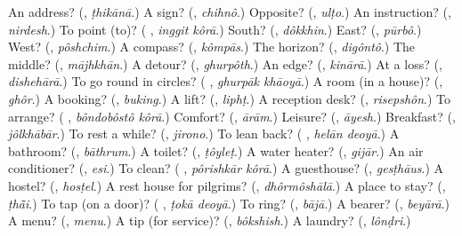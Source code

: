 \begin{tcolorbox}[breakable,colback=teal!4,colframe=teal!35!black,title={Before you move on}]
An address? (\textbf{}, \emph{ṭhikānā}.) A sign? (\textbf{}, \emph{chihnô}.) Opposite? (\textbf{}, \emph{ulṭo}.) An instruction? (\textbf{}, \emph{nirdesh}.) To point (to)? (\textbf{ }, \emph{inggit kôrā}.) South? (\textbf{}, \emph{dôkkhin}.) East? (\textbf{}, \emph{pūrbô}.) West? (\textbf{}, \emph{pôshchim}.) A compass? (\textbf{}, \emph{kômpās}.) The horizon? (\textbf{}, \emph{digôntô}.) The middle? (\textbf{}, \emph{mājhkhān}.) A detour? (\textbf{}, \emph{ghurpôth}.) An edge? (\textbf{}, \emph{kinārā}.) At a loss? (\textbf{}, \emph{dishehārā}.) To go round in circles? (\textbf{ }, \emph{ghurpāk khāoyā}.) A room (in a house)? (\textbf{}, \emph{ghôr}.) A booking? (\textbf{}, \emph{buking}.) A lift? (\textbf{}, \emph{liphṭ}.) A reception desk? (\textbf{}, \emph{risepshôn}.) To arrange? (\textbf{ }, \emph{bôndobôstô kôrā}.) Comfort? (\textbf{}, \emph{ārām}.) Leisure? (\textbf{}, \emph{āyesh}.) Breakfast? (\textbf{}, \emph{jôlkhābār}.) To rest a while? (\textbf{}, \emph{jirono}.) To lean back? (\textbf{ }, \emph{helān deoyā}.) A bathroom? (\textbf{}, \emph{bāthrum}.) A toilet? (\textbf{}, \emph{ṭôyleṭ}.) A water heater? (\textbf{}, \emph{gijār}.) An air conditioner? (\textbf{}, \emph{esi}.) To clean? (\textbf{ }, \emph{pôrishkār kôrā}.) A guesthouse? (\textbf{}, \emph{gesṭhāus}.) A hostel? (\textbf{}, \emph{hosṭel}.) A rest house for pilgrims? (\textbf{}, \emph{dhôrmôshālā}.) A place to stay? (\textbf{}, \emph{ṭhā̃i}.) To tap (on a door)? (\textbf{ }, \emph{ṭokā deoyā}.) To ring? (\textbf{}, \emph{bājā}.) A bearer? (\textbf{}, \emph{beyārā}.) A menu? (\textbf{}, \emph{menu}.) A tip (for service)? (\textbf{}, \emph{bôkshish}.) A laundry? (\textbf{}, \emph{lônḍri}.)
\end{tcolorbox}

